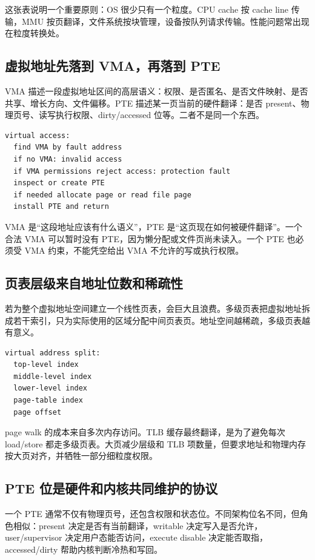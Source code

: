 这张表说明一个重要原则：OS 很少只有一个粒度。CPU cache 按 cache line 传输，MMU 按页翻译，文件系统按块管理，设备按队列请求传输。性能问题常出现在粒度转换处。

\subsection{虚拟地址先落到 VMA，再落到 PTE}

VMA 描述一段虚拟地址区间的高层语义：权限、是否匿名、是否文件映射、是否共享、增长方向、文件偏移。PTE 描述某一页当前的硬件翻译：是否 present、物理页号、读写执行权限、dirty/accessed 位等。二者不是同一个东西。

\begin{lstlisting}
virtual access:
  find VMA by fault address
  if no VMA: invalid access
  if VMA permissions reject access: protection fault
  inspect or create PTE
  if needed allocate page or read file page
  install PTE and return
\end{lstlisting}

VMA 是“这段地址应该有什么语义”，PTE 是“这页现在如何被硬件翻译”。一个合法 VMA 可以暂时没有 PTE，因为懒分配或文件页尚未读入。一个 PTE 也必须受 VMA 约束，不能凭空给出 VMA 不允许的写或执行权限。

\subsection{页表层级来自地址位数和稀疏性}

若为整个虚拟地址空间建立一个线性页表，会巨大且浪费。多级页表把虚拟地址拆成若干索引，只为实际使用的区域分配中间页表页。地址空间越稀疏，多级页表越有意义。

\begin{lstlisting}
virtual address split:
  top-level index
  middle-level index
  lower-level index
  page-table index
  page offset
\end{lstlisting}

page walk 的成本来自多次内存访问。TLB 缓存最终翻译，是为了避免每次 load/store 都走多级页表。大页减少层级和 TLB 项数量，但要求地址和物理内存按大页对齐，并牺牲一部分细粒度权限。

\subsection{PTE 位是硬件和内核共同维护的协议}

一个 PTE 通常不仅有物理页号，还包含权限和状态位。不同架构位名不同，但角色相似：present 决定是否有当前翻译，writable 决定写入是否允许，user/supervisor 决定用户态能否访问，execute disable 决定能否取指，accessed/dirty 帮助内核判断冷热和写回。

